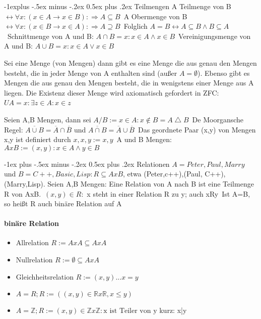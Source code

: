 \documentclass[10pt,landscape]{article}
\makeatletter
\renewcommand{\section}{\@startsection{section}{1}{0mm}%
                                {-1ex plus -.5ex minus -.2ex}%
                                {0.5ex plus .2ex}%
                                {\normalfont\large\bfseries}}
\renewcommand{\subsection}{\@startsection{subsection}{2}{0mm}%
                                {-1explus -.5ex minus -.2ex}%
                                {0.5ex plus .2ex}%
                                {\normalfont\normalsize\bfseries}}
\makeatother
\begin{document}
\begin{multicols}{3}
\subsection{Teilmengen}
A Teilmenge von B $\leftrightarrow \forall x: (x\in A \rightarrow x \in B):\Rightarrow A\subseteq B$\
A Obermenge von B $\leftrightarrow \forall x: (x\in B \rightarrow x \in A):\Rightarrow A\supseteq B$\
Folglich $A=B \leftrightarrow A\subseteq B \wedge B\subseteq A$\
Schnittmenge von A und B: $A\cap B = {x: x\in A \wedge x\in B}$\
Vereinigungsmenge von A und B: $A\cup B = {x: x\in A \vee x\in B}$

Sei eine Menge (von Mengen) dann gibt es eine Menge die aus genau den Mengen besteht, die in jeder Menge von A enthalten sind (außer $A=\emptyset$).
Ebenso gibt es Mengen die aus genau den Mengen besteht, die in wenigstens einer Menge aus A liegen. Die Existenz dieser Menge wird axiomatisch gefordert in ZFC:$ UA = {x: \exists z \in A: x \in z}$\

Seien A,B Mengen, dann sei $A/B:={x\in A: x\not \in B } = A\bigtriangleup B$\
De Moorgansche Regel: $\overline{A \cup B} = \overline{A} \cap \overline{B}$ und $\overline{A\cap B}=\overline{A}\cup \overline{B}$\
Das geordnete Paar (x,y) von Mengen x,y ist definiert durch ${{x},{x,y}}:={x,y}$\
A und B Mengen: $A x B:={(x,y):x\in A \wedge y \in B}$

\section{Relationen}
$A={Peter, Paul, Marry}$ und $B={C++, Basic, Lisp}: R\subseteq AxB$, etwa {(Peter,c++),(Paul, C++), (Marry,Lisp)}. Seien A,B Mengen: Eine Relation von A nach B ist eine Teilmenge R von AxB.\
$(x,y)\in R:$ x steht in einer Relation R zu y; auch xRy\
Ist A=B, so heißt R auch binäre Relation auf A

\paragraph{binäre Relation}
\begin{itemize}
    \item Allrelation $R:=AxA \subseteq AxA$
    \item Nullrelation $R:=\emptyset \subseteq AxA$
    \item Gleichheitsrelation $R:={(x,y)... x=y}$
    \item $A=R; R:=((x,y)\in \mathbb{R} x \mathbb{R}, x \leq y)$
    \item $A=\mathbb{Z}; R:={(x,y)\in \mathbb{Z} x \mathbb{Z}: \text{x ist Teiler von y} }$ kurz: x|y
\end{itemize}


\end{multicols}
\end{document}
